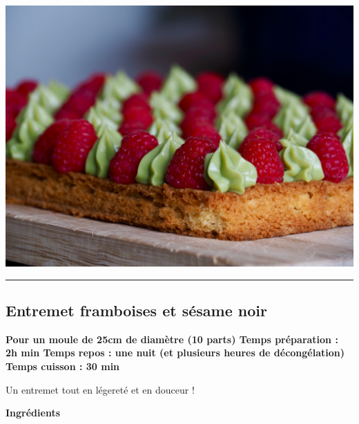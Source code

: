 \documentclass[]{book}
\begin{document}
\begin{center}\includegraphics[width=0.9\linewidth]{photos/framb_matcha2} \end{center}

\begin{center}\rule{0.5\linewidth}{0.5pt}\end{center}

\subsection*{\texorpdfstring{{Entremet framboises et sésame
noir}}{Entremet framboises et sésame noir}}\label{entremet-framboises-et-suxe9same-noir}

\begin{sucrebox}
\textbf{Pour un moule de 25cm de diamètre (10 parts) \textbar{} Temps
préparation : 2h min \textbar{} Temps repos : une nuit (et plusieurs
heures de décongélation) \textbar{} Temps cuisson : 30 min}

Un entremet tout en légereté et en douceur !
\end{sucrebox}

\textbf{Ingrédients}
\end{document}
